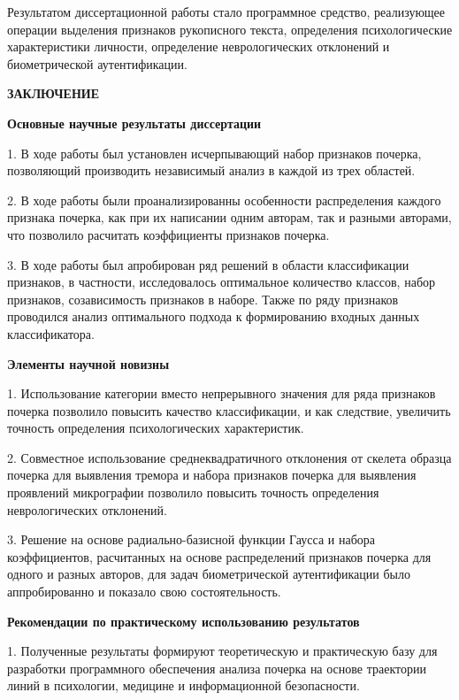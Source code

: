 Результатом диссертационной работы стало программное средство, реализующее операции выделения признаков рукописного текста, определения психологические характеристики личности, определение неврологических отклонений и биометрической аутентификации.

\clearpage

\begin{center}
{\bfseries ЗАКЛЮЧЕНИЕ}
\end{center}

\textbf{Основные научные результаты диссертации}
\bigskip

1. В ходе работы был установлен исчерпывающий набор признаков почерка, позволяющий производить независимый анализ в каждой из трех областей.

2. В ходе работы были проанализированны особенности распределения каждого признака почерка, как при их написании одним авторам, так и разными авторами, что позволило расчитать коэффициенты признаков почерка.

3. В ходе работы был апробирован ряд решений в области классификации признаков, в частности, исследовалось оптимальное количество классов, набор признаков, созависимость признаков в наборе. Также по ряду признаков проводился анализ оптимального подхода к формированию входных данных классификатора.

\bigskip
\textbf{Элементы научной новизны}
\bigskip

1. Использование категории вместо непрерывного значения для ряда признаков почерка позволило повысить качество классификации, и как следствие, увеличить точность определения психологических характеристик.

2. Совместное использование среднеквадратичного отклонения от скелета образца почерка для выявления тремора и набора признаков почерка для выявления проявлений микрографии позволило повысить точность определения неврологических отклонений.

3. Решение на основе радиально-базисной функции Гаусса и набора коэффициентов, расчитанных на основе распределений признаков почерка для одного и разных авторов, для задач биометрической аутентификации было аппробированно и показало свою состоятельность.

\bigskip
\textbf{Рекомендации по практическому использованию результатов}
\bigskip

1. Полученные результаты формируют теоретическую и практическую базу для разработки программного обеспечения анализа почерка на основе траектории линий в психологии, медицине и информационной безопасности.

